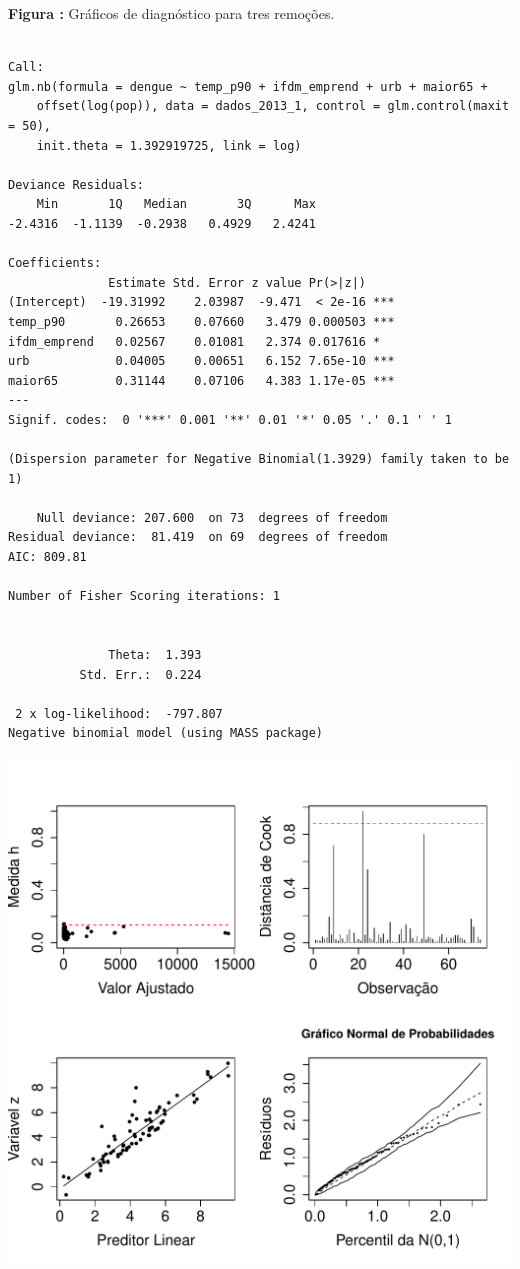\documentclass[12pt,a4paper]{article}\usepackage[]{graphicx}\usepackage[]{color}
\makeatletter
\def\maxwidth{ %
  \ifdim\Gin@nat@width>\linewidth
    \linewidth
  \else
    \Gin@nat@width
  \fi
}
\newenvironment{kframe}{%
 \def\at@end@of@kframe{}%
 \ifinner\ifhmode%
  \def\at@end@of@kframe{\end{minipage}}%
  \begin{minipage}{\columnwidth}%
 \fi\fi%
 \def\FrameCommand##1{\hskip\@totalleftmargin \hskip-\fboxsep
 \colorbox{shadecolor}{##1}\hskip-\fboxsep
     \hskip-\linewidth \hskip-\@totalleftmargin \hskip\columnwidth}%
 \MakeFramed {\advance\hsize-\width
   \@totalleftmargin\z@ \linewidth\hsize
   \@setminipage}}%
 {\par\unskip\endMakeFramed%
 \at@end@of@kframe}
\newenvironment{knitrout}{}{} %
\makeatother
\begin{document}
\textbf{Figura :} Gráficos de diagnóstico para tres remoções.





\begin{knitrout}
\color{fgcolor}\begin{kframe}
\begin{verbatim}

Call:
glm.nb(formula = dengue ~ temp_p90 + ifdm_emprend + urb + maior65 + 
    offset(log(pop)), data = dados_2013_1, control = glm.control(maxit = 50), 
    init.theta = 1.392919725, link = log)

Deviance Residuals: 
    Min       1Q   Median       3Q      Max  
-2.4316  -1.1139  -0.2938   0.4929   2.4241  

Coefficients:
              Estimate Std. Error z value Pr(>|z|)    
(Intercept)  -19.31992    2.03987  -9.471  < 2e-16 ***
temp_p90       0.26653    0.07660   3.479 0.000503 ***
ifdm_emprend   0.02567    0.01081   2.374 0.017616 *  
urb            0.04005    0.00651   6.152 7.65e-10 ***
maior65        0.31144    0.07106   4.383 1.17e-05 ***
---
Signif. codes:  0 '***' 0.001 '**' 0.01 '*' 0.05 '.' 0.1 ' ' 1

(Dispersion parameter for Negative Binomial(1.3929) family taken to be 1)

    Null deviance: 207.600  on 73  degrees of freedom
Residual deviance:  81.419  on 69  degrees of freedom
AIC: 809.81

Number of Fisher Scoring iterations: 1


              Theta:  1.393 
          Std. Err.:  0.224 

 2 x log-likelihood:  -797.807 
Negative binomial model (using MASS package) 
\end{verbatim}
\end{kframe}
\includegraphics[width=\maxwidth]{figure/unnamed-chunk-28-1} 

\end{knitrout}
\end{document}
